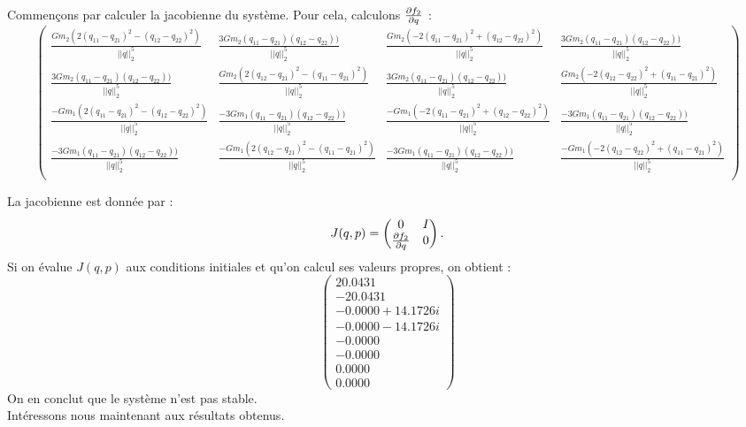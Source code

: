 Commençons par calculer la jacobienne du système. Pour cela, calculons $\frac{\partial f_2}{\partial q}$ :
$$
\begin{pmatrix}
\frac{Gm_2(2(q_{11}-q_{21})^2 - (q_{12} - q_{22})^2)}{||q||^5_2} & \frac{3Gm_2(q_{11}-q_{21})(q_{12} - q_{22}))}{||q||^5_2} & \frac{Gm_2(-2(q_{11}-q_{21})^2 + (q_{12} - q_{22})^2)}{||q||^5_2} & \frac{3Gm_2(q_{11}-q_{21})(q_{12} - q_{22}))}{||q||^5_2} \\
\frac{3Gm_2(q_{11}-q_{21})(q_{12} - q_{22}))}{||q||^5_2} & \frac{Gm_2(2(q_{12}-q_{21})^2 - (q_{11} - q_{21})^2)}{||q||^5_2} & \frac{3Gm_2(q_{11}-q_{21})(q_{12} - q_{22}))}{||q||^5_2} & \frac{Gm_2(-2(q_{12}-q_{22})^2 + (q_{11} - q_{21})^2)}{||q||^5_2} \\
\frac{-Gm_1(2(q_{11}-q_{21})^2 - (q_{12} - q_{22})^2)}{||q||^5_2} & \frac{-3Gm_1(q_{11}-q_{21})(q_{12} - q_{22}))}{||q||^5_2} & \frac{-Gm_1(-2(q_{11}-q_{21})^2 + (q_{12} - q_{22})^2)}{||q||^5_2} & \frac{-3Gm_1(q_{11}-q_{21})(q_{12} - q_{22}))}{||q||^5_2} \\
\frac{-3Gm_1(q_{11}-q_{21})(q_{12} - q_{22}))}{||q||^5_2} & \frac{-Gm_1(2(q_{12}-q_{21})^2 - (q_{11} - q_{21})^2)}{||q||^5_2} & \frac{-3Gm_1(q_{11}-q_{21})(q_{12} - q_{22}))}{||q||^5_2} & \frac{-Gm_1(-2(q_{12}-q_{22})^2 + (q_{11} - q_{21})^2)}{||q||^5_2} \\
\end{pmatrix}
$$

La jacobienne est donnée par : 
\begin{equation}
J(q,p) = 
\begin{pmatrix}
0 & I\\
\frac{\partial f_2}{\partial q} & 0
\end{pmatrix}.
\end{equation}
Si on évalue $J(q,p)$ aux conditions initiales et qu'on calcul ses valeurs propres, on obtient : 
$$
\begin{pmatrix}
20.0431    \\
-20.0431   \\
-0.0000 +14.1726i \\
-0.0000 -14.1726i  \\
-0.0000          \\
-0.0000          \\
0.0000          \\
0.0000 
\end{pmatrix}
$$
On en conclut que le système n'est pas stable.\\

Intéressons nous maintenant aux résultats obtenus. 

